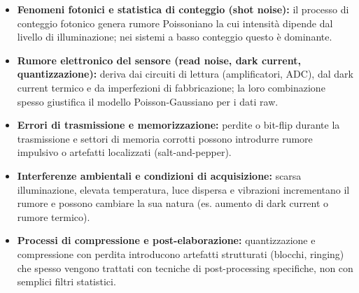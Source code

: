 \documentclass[12pt,a4paper,openright,twoside]{book}
\begin{document}
\begin{itemize}
    \item \textbf{Fenomeni fotonici e statistica di conteggio (shot noise):} il processo di conteggio fotonico genera rumore Poissoniano la cui intensità dipende dal livello di illuminazione; nei sistemi a basso conteggio questo è dominante. \parencite{foi2008, janesick2007}
    \item \textbf{Rumore elettronico del sensore (read noise, dark current, quantizzazione):} deriva dai circuiti di lettura (amplificatori, ADC), dal dark current termico e da imperfezioni di fabbricazione; la loro combinazione spesso giustifica il modello Poisson-Gaussiano per i dati raw. \parencite{janesick2007, foi2008}
    \item \textbf{Errori di trasmissione e memorizzazione:} perdite o bit-flip durante la trasmissione e settori di memoria corrotti possono introdurre rumore impulsivo o artefatti localizzati (salt-and-pepper). \parencite{gomez2014}
    \item \textbf{Interferenze ambientali e condizioni di acquisizione:} scarsa illuminazione, elevata temperatura, luce dispersa e vibrazioni incrementano il rumore e possono cambiare la sua natura (es. aumento di dark current o rumore termico). \parencite{janesick2007}
    \item \textbf{Processi di compressione e post-elaborazione:} quantizzazione e compressione con perdita introducono artefatti strutturati (blocchi, ringing) che spesso vengono trattati con tecniche di post-processing specifiche, non con semplici filtri statistici. \parencite{wallace1991, eschbach1997}
\end{itemize}
\end{document}
